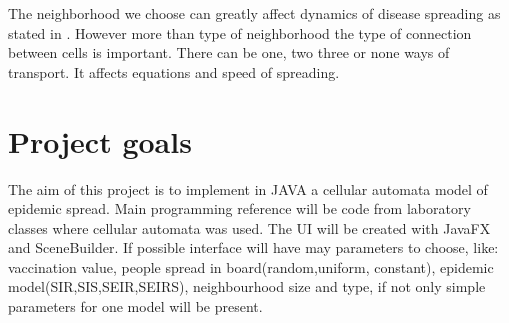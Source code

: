 \documentclass[a4paper, 11pt]{article}
\begin{document}
	The neighborhood we choose can greatly affect dynamics of disease spreading as stated in \cite{cisse}. However more than type of neighborhood the type of connection between cells is important. There can be one, two three or none ways of transport. It affects equations and speed of spreading.\cite{WHITE} \\
	
	

\section{Project goals}

The aim of this project is to implement in JAVA a cellular automata model of epidemic spread. Main programming reference will be code from laboratory classes where cellular automata was used. The UI will be created with JavaFX and SceneBuilder. If possible interface  will have may parameters to choose, like: vaccination value,  people spread in board(random,uniform, constant), epidemic model(SIR,SIS,SEIR,SEIRS), neighbourhood size and type, if not only simple parameters for one model will be present. 


	
	
\end{document}
